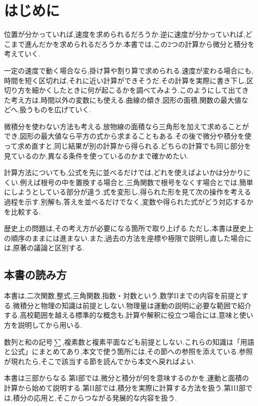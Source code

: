 \chapter*{はじめに}
位置が分かっていれば,速度を求められるだろうか.逆に速度が分かっていれば,どこまで進んだかを求められるだろうか.本書では,この2つの計算から微分と積分を考えていく.

一定の速度で動く場合なら,掛け算や割り算で求められる.速度が変わる場合にも,時間を短く区切れば,それに近い計算ができそうだ.その計算を実際に書き下し,区切り方を細かくしたときに何が起こるかを調べてみよう.このようにして出てきた考え方は,時間以外の変数にも使える.曲線の傾き,図形の面積,関数の最大値などへ,扱うものを広げていく.

微積分を使わない方法も考える.放物線の面積なら三角形を加えて求めることができ,図形の最大値なら平方の式から求まることもある.その後で微分や積分を使って求め直すと,同じ結果が別の計算から得られる.どちらの計算でも同じ部分を見ているのか,異なる条件を使っているのかまで確かめたい.

計算方法についても,公式を先に並べるだけでは,どれを使えばよいかは分かりにくい.例えば根号の中を置換する場合と,三角関数で根号をなくす場合とでは,簡単にしようとしている部分が違う.式を変形し,得られた形を見て次の操作を考える過程を示す.別解も,答えを並べるだけでなく,変数や得られた式がどう対応するかを比較する.

歴史上の問題は,その考え方が必要になる箇所で取り上げる.ただし,本書は歴史上の順序のままには進まない.また,過去の方法を座標や極限で説明し直した場合には,原著の議論と区別する.

\section*{本書の読み方}
本書は,二次関数,整式,三角関数,指数・対数という,数学IIまでの内容を前提とする.微積分と物理の知識は前提としない.物理量は運動の説明に必要な範囲で紹介する.高校範囲を越える標準的な概念も,計算や解釈に役立つ場合には,意味と使い方を説明してから用いる.

数列と和の記号$\sum$,複素数と複素平面なども前提としない.これらの知識は「用語と公式」にまとめてあり,本文で使う箇所には,その節への参照を添えている.参照が現れたら,そこで該当する節を読んでから本文へ戻ればよい.

本書は三部からなる.第I部では,微分と積分が何を意味するのかを,運動と面積の計算から始めて説明する.第II部では,積分を実際に計算する方法を扱う.第III部では,積分の応用と,そこからつながる発展的な内容を扱う.

